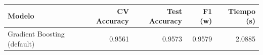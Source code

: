 \begin{tabular}{lrrrr}
\toprule
Modelo & CV Accuracy & Test Accuracy & F1 (w) & Tiempo (s) \\
\midrule
Gradient Boosting (default) & 0.9561 & 0.9573 & 0.9579 & 2.0885 \\
\bottomrule
\end{tabular}
